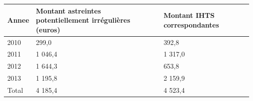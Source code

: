 \begin{longtable}[]{@{}lll@{}}
\toprule
\begin{minipage}[b]{0.07\columnwidth}\raggedright
Annee\strut
\end{minipage} & \begin{minipage}[b]{0.55\columnwidth}\raggedright
Montant astreintes potentiellement irrégulières (euros)\strut
\end{minipage} & \begin{minipage}[b]{0.29\columnwidth}\raggedright
Montant IHTS correspondantes\strut
\end{minipage}\tabularnewline
\midrule
\endhead
\begin{minipage}[t]{0.07\columnwidth}\raggedright
2010\strut
\end{minipage} & \begin{minipage}[t]{0.55\columnwidth}\raggedright
299,0\strut
\end{minipage} & \begin{minipage}[t]{0.29\columnwidth}\raggedright
392,8\strut
\end{minipage}\tabularnewline
\begin{minipage}[t]{0.07\columnwidth}\raggedright
2011\strut
\end{minipage} & \begin{minipage}[t]{0.55\columnwidth}\raggedright
1 046,4\strut
\end{minipage} & \begin{minipage}[t]{0.29\columnwidth}\raggedright
1 317,0\strut
\end{minipage}\tabularnewline
\begin{minipage}[t]{0.07\columnwidth}\raggedright
2012\strut
\end{minipage} & \begin{minipage}[t]{0.55\columnwidth}\raggedright
1 644,3\strut
\end{minipage} & \begin{minipage}[t]{0.29\columnwidth}\raggedright
653,8\strut
\end{minipage}\tabularnewline
\begin{minipage}[t]{0.07\columnwidth}\raggedright
2013\strut
\end{minipage} & \begin{minipage}[t]{0.55\columnwidth}\raggedright
1 195,8\strut
\end{minipage} & \begin{minipage}[t]{0.29\columnwidth}\raggedright
2 159,9\strut
\end{minipage}\tabularnewline
\begin{minipage}[t]{0.07\columnwidth}\raggedright
Total\strut
\end{minipage} & \begin{minipage}[t]{0.55\columnwidth}\raggedright
4 185,4\strut
\end{minipage} & \begin{minipage}[t]{0.29\columnwidth}\raggedright
4 523,4\strut
\end{minipage}\tabularnewline
\bottomrule
\end{longtable}

